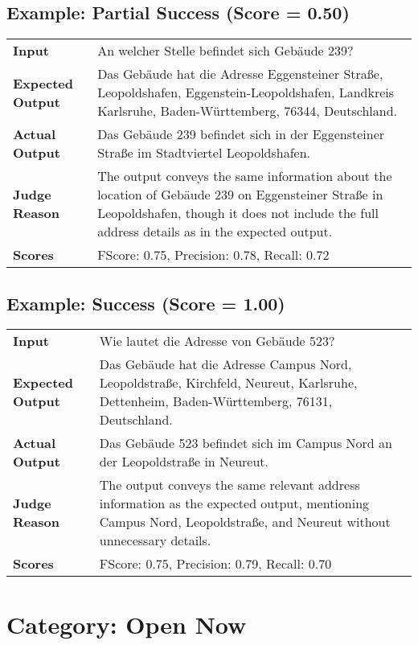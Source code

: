 \documentclass{article}
\begin{document}
\subsection*{Example: Partial Success (Score = 0.50)}
\begin{longtable}{p{} p{}}
\textbf{Input} & An welcher Stelle befindet sich Gebäude 239? \\
\textbf{Expected Output} & Das Gebäude hat die Adresse Eggensteiner Straße, Leopoldshafen, Eggenstein-Leopoldshafen, Landkreis Karlsruhe, Baden-Württemberg, 76344, Deutschland. \\
\textbf{Actual Output} & Das Gebäude 239 befindet sich in der Eggensteiner Straße im Stadtviertel Leopoldshafen. \\
\textbf{Judge Reason} & The output conveys the same information about the location of Gebäude 239 on Eggensteiner Straße in Leopoldshafen, though it does not include the full address details as in the expected output. \\
\textbf{Scores} & FScore: 0.75, Precision: 0.78, Recall: 0.72 \\
\end{longtable}
\subsection*{Example: Success (Score = 1.00)}
\begin{longtable}{p{} p{}}
\textbf{Input} & Wie lautet die Adresse von Gebäude 523? \\
\textbf{Expected Output} & Das Gebäude hat die Adresse Campus Nord, Leopoldstraße, Kirchfeld, Neureut, Karlsruhe, Dettenheim, Baden-Württemberg, 76131, Deutschland. \\
\textbf{Actual Output} & Das Gebäude 523 befindet sich im Campus Nord an der Leopoldstraße in Neureut. \\
\textbf{Judge Reason} & The output conveys the same relevant address information as the expected output, mentioning Campus Nord, Leopoldstraße, and Neureut without unnecessary details. \\
\textbf{Scores} & FScore: 0.75, Precision: 0.79, Recall: 0.70 \\
\end{longtable}
\section*{Category: Open Now}
\end{document}
